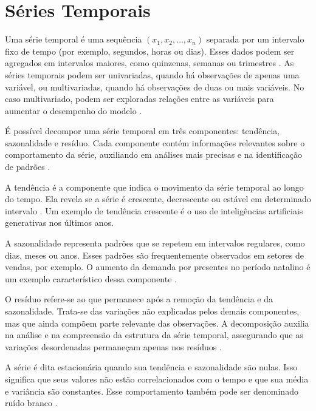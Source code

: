 \documentclass[12pt]{tcc}
\begin{document}
\section{Séries Temporais}
\label{sec:series_temporais}

Uma série temporal é uma sequência $(x_1, x_2, \dots, x_n)$ separada por um intervalo fixo de tempo (por exemplo, segundos, horas ou dias). Esses dados podem ser agregados em intervalos maiores, como quinzenas, semanas ou trimestres \citep{gujarati_basic_2003}. As séries temporais podem ser univariadas, quando há observações de apenas uma variável, ou multivariadas, quando há observações de duas ou mais variáveis. No caso multivariado, podem ser exploradas relações entre as variáveis para aumentar o desempenho do modelo \citep{silvestrini2008temporal}. 

É possível decompor uma série temporal em três componentes: tendência, sazonalidade e resíduo. Cada componente contém informações relevantes sobre o comportamento da série, auxiliando em análises mais precisas e na identificação de padrões \citep{ogasawara_event_2025}.

A tendência é a componente que indica o movimento da série temporal ao longo do tempo. Ela revela se a série é crescente, decrescente ou estável em determinado intervalo \citep{ogasawara_event_2025}. Um exemplo de tendência crescente é o uso de inteligências artificiais generativas nos últimos anos.

A sazonalidade representa padrões que se repetem em intervalos regulares, como dias, meses ou anos. Esses padrões são frequentemente observados em setores de vendas, por exemplo. O aumento da demanda por presentes no período natalino é um exemplo característico dessa componente \citep{ogasawara_event_2025, zellner_seasonal_1978}.

O resíduo refere-se ao que permanece após a remoção da tendência e da sazonalidade. Trata-se das variações não explicadas pelos demais componentes, mas que ainda compõem parte relevante das observações. A decomposição auxilia na análise e na compreensão da estrutura da série temporal, assegurando que as variações desordenadas permaneçam apenas nos resíduos \citep{ogasawara_event_2025}.

A série é dita estacionária quando sua tendência e sazonalidade são nulas. Isso significa que seus valores não estão correlacionados com o tempo e que sua média e variância são constantes. Esse comportamento também pode ser denominado ruído branco \citep{hyndman_forecasting_2018,sato_gerenciamento_2013}.
\end{document}

